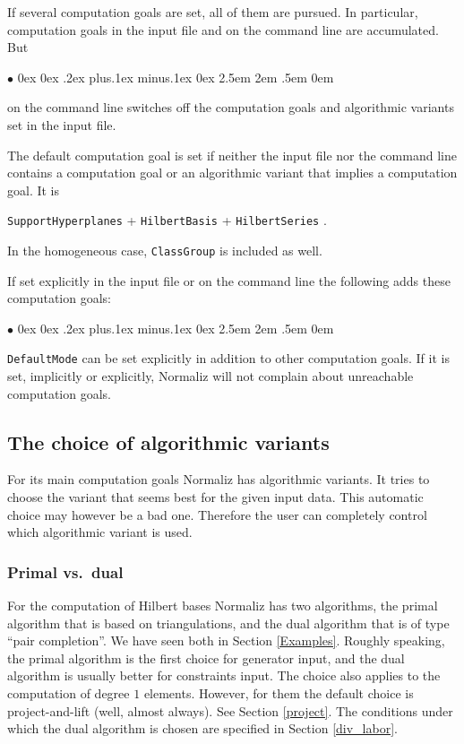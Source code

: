 \documentclass[12pt,a4paper]{scrartcl}
\newcommand{\stdli}{ \topsep0ex \partopsep0ex %
\parsep.2ex plus.1ex minus.1ex \itemsep0ex%
\leftmargin2.5em \labelwidth2em \labelsep.5em \rightmargin0em}%
\renewenvironment{itemize}{\begin{list}{{$\bullet$}}{\stdli}}{\end{list}}
\theoremstyle{definition}
\def\itemtt[#1]{\item[\textbf{\ttt{#1}}]}
\def\ttt{\texttt}
\begin{document}
If several computation goals are set, all of them are pursued. In particular, computation goals in the input file and on the command line are accumulated. But
\begin{itemize}
	\itemtt[-{}-ignore, -i] on the command line switches off the computation goals and algorithmic variants set in the input file.
\end{itemize}

The default computation goal is set if neither the input file nor the command line contains a computation goal or an algorithmic variant that implies a computation goal. It is
\begin{center}
	\verb|SupportHyperplanes| + \verb|HilbertBasis| + \verb|HilbertSeries| .
\end{center} 
In the homogeneous case,  \verb|ClassGroup| is included as well.

If set explicitly in the input file or on the command line the following adds these computation goals:
\begin{itemize}
	\itemtt[DefaultMode]
\end{itemize}

\verb|DefaultMode| can be set explicitly in addition to other computation goals. If it is set, implicitly or explicitly, Normaliz will not complain about unreachable computation goals.

\subsection{The choice of algorithmic variants}

For its main computation goals Normaliz has algorithmic variants. It tries to choose the variant that seems best for the given input data. This automatic choice may however be a bad one. Therefore the user can completely control which algorithmic variant is used.

\subsubsection{Primal vs.\ dual}

For the computation of Hilbert bases Normaliz has two algorithms, the primal algorithm that is based on triangulations, and the dual algorithm that is of type ``pair completion''. We have seen both in Section \ref{Examples}. Roughly speaking, the primal algorithm is the first choice for generator input, and the dual algorithm is usually better for constraints input. The choice also applies to the computation of degree $1$ elements. However, for them the default choice is project-and-lift (well, almost always). See Section \ref{project}. The conditions under which the dual algorithm is chosen are specified in Section \ref{div_labor}.
\end{document}
